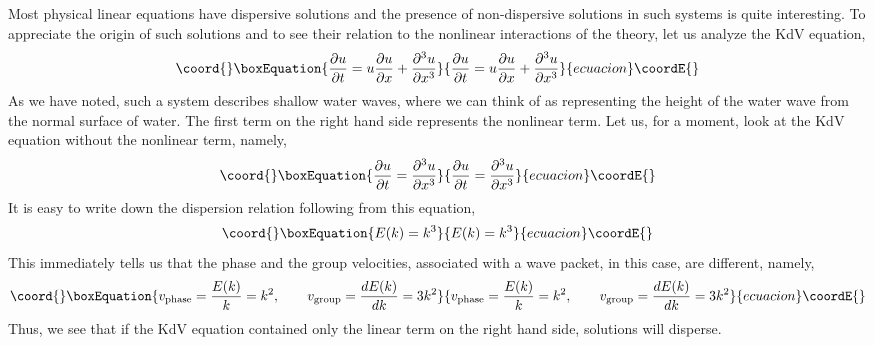 \documentclass[a4paper,11pt]{article}
\begin{document}
Most physical linear equations have dispersive solutions and the
presence of non-dispersive solutions in such systems is quite
interesting. To appreciate the origin of such solutions and to see
their relation to the nonlinear interactions of the theory, let us
analyze the KdV equation,
\begin{equation}\coord{}\boxEquation{
{\partial u\over \partial t} = u {\partial u\over \partial x} +
{\partial^{3} u\over \partial x^{3}}
}{
{\partial u\over \partial t} = u {\partial u\over \partial x} +
{\partial^{3} u\over \partial x^{3}}
}{ecuacion}\coordE{}\end{equation}
As we have noted, such a system describes shallow water waves, where
we can think of \coordHE{} as representing the height of the water wave
from the normal surface of water. The first term on the right hand
side represents the nonlinear term. Let us, for a moment, look at the
KdV equation without the nonlinear term, namely,
\begin{equation}\coord{}\boxEquation{
{\partial u\over \partial t} = {\partial^{3} u\over \partial x^{3}}
}{
{\partial u\over \partial t} = {\partial^{3} u\over \partial x^{3}}
}{ecuacion}\coordE{}\end{equation}
It is easy to write down the dispersion relation following from this
equation, 
\begin{equation}\coord{}\boxEquation{
E(k) = k^{3}
}{
E(k) = k^{3}
}{ecuacion}\coordE{}\end{equation}
This immediately tells us that the phase and the group velocities,
associated with a wave packet, in this case, are different, namely,
\begin{equation}\coord{}\boxEquation{
v_{\rm phase} = {E(k)\over k} = k^{2},\qquad v_{\rm group} = {d
E(k)\over dk} = 3k^{2}
}{
v_{\rm phase} = {E(k)\over k} = k^{2},\qquad v_{\rm group} = {d
E(k)\over dk} = 3k^{2}
}{ecuacion}\coordE{}\end{equation}
Thus, we see that if the KdV equation contained only the linear term
on the right hand side, solutions will disperse.
\end{document}

